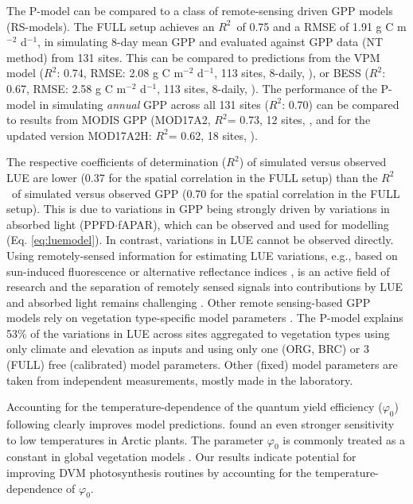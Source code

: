 \documentclass{myreport}
\newcommand{\rsq}{$R^2$}
\begin{document}
The P-model can be compared to a class of remote-sensing driven GPP models (RS-models). The FULL setup achieves an \rsq\ of 0.75 and a RMSE of 1.91 g C m$^{-2}$ d$^{-1}$, in simulating 8-day mean GPP and evaluated against GPP data (NT method) from 131 sites. This can be compared to predictions from the VPM model (\rsq : 0.74, RMSE: 2.08 g C m$^{-2}$ d$^{-1}$, 113 sites, 8-daily, \citet{Zhang2017-yr}), or BESS (\rsq : 0.67, RMSE: 2.58 g C m$^{-2}$ d$^{-1}$, 113 sites, 8-daily, \citet{jiang16rse}). The performance of the P-model in simulating \textit{annual} GPP across all 131 sites (\rsq : 0.70) can be compared to results from MODIS GPP (MOD17A2, \rsq = 0.73, 12 sites, \citet{heinsch06}, and for the updated version MOD17A2H: \rsq = 0.62, 18 sites, \citet{wang17rs}). 

The respective coefficients of determination (\rsq ) of simulated versus observed LUE are lower (0.37 for the spatial correlation in the FULL setup) than the \rsq\ of simulated versus observed GPP (0.70 for the spatial correlation in the FULL setup). This is due to variations in GPP being strongly driven by variations in absorbed light (PPFD$\cdot$fAPAR), which can be observed and used for modelling (Eq. \ref{eq:luemodel}). In contrast, variations in LUE cannot be observed directly. Using remotely-sensed information for estimating LUE variations, e.g., based on sun-induced fluorescence \citep{frankenberg18, li18gcb, ryu19rse} or alternative reflectance indices \citep{gamon92, gamon16pnas, Badgley2017-tw}, is an active field of research and the separation of remotely sensed signals into contributions by LUE and absorbed light remains challenging \citep{porcarcastell14, ryu19rse}. Other remote sensing-based GPP models rely on vegetation type-specific model parameters \citep{Zhang2017-yr, running04, jiang16rse}. The P-model explains 53\% of the variations in LUE across sites aggregated to vegetation types using only climate and elevation as inputs and using only one (ORG, BRC) or 3 (FULL) free (calibrated) model parameters. Other (fixed) model parameters are taken from independent measurements, mostly made in the laboratory. %

Accounting for the temperature-dependence of the quantum yield efficiency ($\varphi_0$) following \citet{bernacchi03pce} clearly improves model predictions. \citet{rogers19newphyt} found an even stronger sensitivity to low temperatures in Arctic plants. The parameter $\varphi_0$ is commonly treated as a constant in global vegetation models \citep{rogers17}. Our results indicate potential for improving DVM photosynthesis routines by accounting for the temperature-dependence of $\varphi_0$. 
\end{document}
